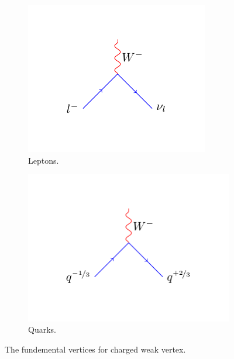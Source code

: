 \begin{figure}[htbp]
  \centering
  \begin{subfigure}{0.45\textwidth}
    \centering
    \includegraphics[width=\textwidth]{weak_charged_lepton_process}
    \caption{Leptons.}
    \label{fig:weak_charged_lepton_process}
  \end{subfigure}
  \begin{subfigure}{0.45\textwidth}
    \centering
    \includegraphics[width=\textwidth]{weak_charged_quark_process}
    \caption{Quarks.}
    \label{fig:weak_charged_quark_process}
  \end{subfigure}
  \caption{The fundemental vertices for charged weak vertex.}
  \label{fig:weak_charged}
\end{figure}

